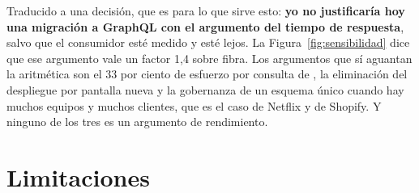 \documentclass[11pt,letterpaper]{article}
\begin{document}
Traducido a una decisión, que es para lo que sirve esto: \textbf{yo no
justificaría hoy una migración a GraphQL con el argumento del tiempo de
respuesta}, salvo que el consumidor esté medido y esté lejos. La
Figura~\ref{fig:sensibilidad} dice que ese argumento vale un factor 1,4 sobre
fibra. Los argumentos que sí aguantan la aritmética son el 33 por ciento de
esfuerzo por consulta de \textcite{brito2020}, la eliminación del despliegue
por pantalla nueva y la gobernanza de un esquema único cuando hay muchos
equipos y muchos clientes, que es el caso de Netflix y de Shopify. Y ninguno de
los tres es un argumento de rendimiento.

\section{Limitaciones}
\end{document}
